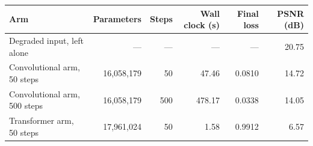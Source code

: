 \begin{tabular}{lrrrrr}
\toprule
Arm & Parameters & Steps & Wall clock (s) & Final loss & PSNR (dB) \\
\midrule
Degraded input, left alone & --- & --- & --- & --- & 20.75 \\
Convolutional arm, 50 steps & 16,058,179 & 50 & 47.46 & 0.0810 & 14.72 \\
Convolutional arm, 500 steps & 16,058,179 & 500 & 478.17 & 0.0338 & 14.05 \\
Transformer arm, 50 steps & 17,961,024 & 50 & 1.58 & 0.9912 & 6.57 \\
\bottomrule
\end{tabular}
